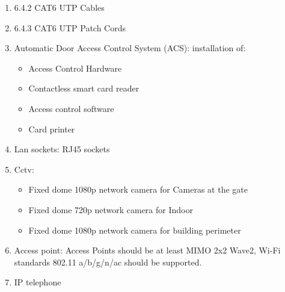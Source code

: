 \documentclass[12pt]{article}
\begin{document}
\begin{enumerate}
    \item 6.4.2 CAT6 UTP Cables
    \item 6.4.3 CAT6 UTP Patch Cords
    \item Automatic Door Access Control System (ACS): installation of:
    \begin{itemize}
        \item Access Control Hardware
        \item Contactless smart card reader
        \item Access control software
        \item Card printer
    \end{itemize} 
    \item Lan sockets: RJ45 sockets
    \item Cctv:
    \begin{itemize}
        \item Fixed dome 1080p network camera for Cameras at the gate 
        \item Fixed dome 720p network camera for Indoor 
        \item Fixed dome 1080p network camera for building perimeter 
    \end{itemize} 
    \item Access point: Access Points should be at least MIMO 2x2 Wave2, Wi-Fi standards 802.11 a/b/g/n/ac should be supported. 
    \item IP telephone
    
\end{enumerate}
\end{document}
